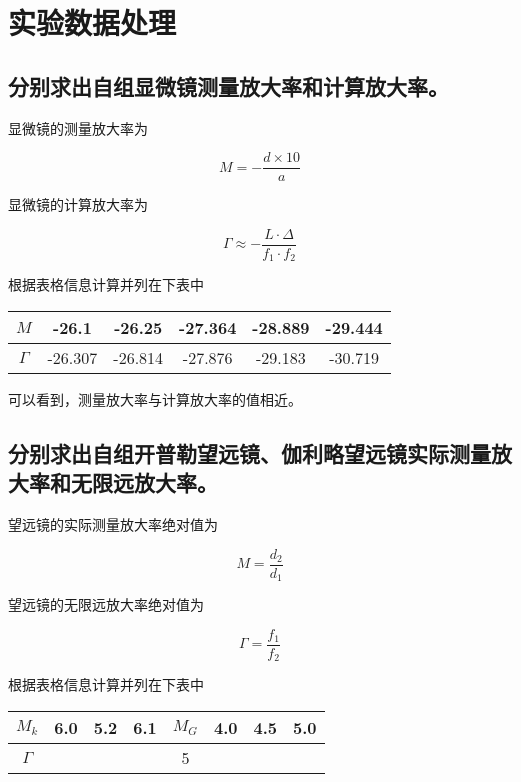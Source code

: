 \documentclass{ctexart}
\begin{document}
\newpage
\section{实验数据处理}
\subsection{分别求出自组显微镜测量放大率和计算放大率。}

显微镜的测量放大率为

$$ M = -\frac{d \times 10}{a} $$

显微镜的计算放大率为

$$ \Gamma \approx -\frac{L\cdot \Delta}{f_1\cdot f_2} $$

根据表格信息计算并列在下表中

\begin{table}[h]
    \centering
    \begin{tabular}{ c | c c c c c }
      \hline
      $M$  & -26.1 &-26.25 &-27.364 &-28.889 &-29.444 \\
      \hline
      $\Gamma $ & -26.307 &-26.814 &-27.876 &-29.183 &-30.719 \\
      \hline
    \end{tabular}
\end{table}

可以看到，测量放大率与计算放大率的值相近。

\subsection{分别求出自组开普勒望远镜、伽利略望远镜实际测量放大率和无限远放大率。}

望远镜的实际测量放大率绝对值为

$$ M = \frac{d_2}{d_1} $$

望远镜的无限远放大率绝对值为

$$ \Gamma = \frac{f_1}{f_2} $$

根据表格信息计算并列在下表中


\begin{table}[h]
    \centering
    \begin{tabular}{ c | c c c |c| c c c }
      \hline
      $ M_k $  & 6.0 & 5.2 & 6.1 & $ M_G $ & 4.0 & 4.5 & 5.0 \\
      \hline
      $\Gamma $ & \multicolumn{7}{c}{5} \\
      \hline
    \end{tabular}
\end{table}
\end{document}
